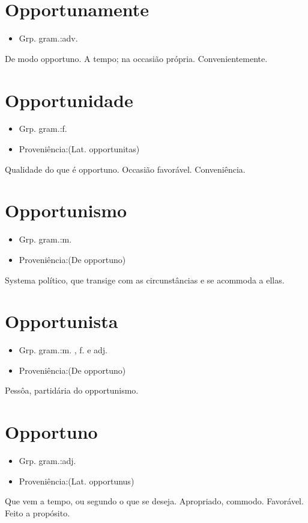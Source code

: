\section{Opportunamente}
\begin{itemize}
\item {Grp. gram.:adv.}
\end{itemize}
De modo opportuno.
A tempo; na occasião própria.
Convenientemente.
\section{Opportunidade}
\begin{itemize}
\item {Grp. gram.:f.}
\end{itemize}
\begin{itemize}
\item {Proveniência:(Lat. \textunderscore opportunitas\textunderscore )}
\end{itemize}
Qualidade do que é opportuno.
Occasião favorável.
Conveniência.
\section{Opportunismo}
\begin{itemize}
\item {Grp. gram.:m.}
\end{itemize}
\begin{itemize}
\item {Proveniência:(De \textunderscore opportuno\textunderscore )}
\end{itemize}
Systema político, que transige com as circunstâncias e se acommoda a ellas.
\section{Opportunista}
\begin{itemize}
\item {Grp. gram.:m. ,  f.  e  adj.}
\end{itemize}
\begin{itemize}
\item {Proveniência:(De \textunderscore opportuno\textunderscore )}
\end{itemize}
Pessôa, partidária do opportunismo.
\section{Opportuno}
\begin{itemize}
\item {Grp. gram.:adj.}
\end{itemize}
\begin{itemize}
\item {Proveniência:(Lat. \textunderscore opportunus\textunderscore )}
\end{itemize}
Que vem a tempo, ou segundo o que se deseja.
Apropriado, commodo.
Favorável.
Feito a propósito.
